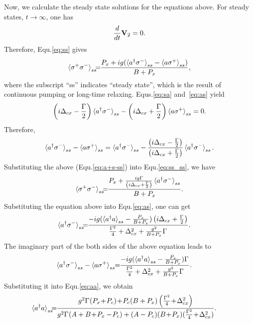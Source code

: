 Now, we calculate the steady state solutions for the equations above. For steady states, $t\rightarrow \infty$, one has
\begin{equation}
\frac{d}{dt} \mathbf{V}_2=0.
\end{equation}
Therefore, Equ.\eqref{eq:ss} gives
\begin{equation}\label{eq:ss_ss}
\mathinner{\langle{\sigma^+\sigma^-}\rangle}_{ss}\!\!\!=\!\!
\frac{P_x+ig(\mathinner{\langle{a^\dagger\sigma^-}\rangle}_{ss}-\mathinner{\langle{a\sigma^+}\rangle}_{ss})}{B+P_x},
\end{equation}
where the subscript ``ss'' indicates ``steady state'', which is the result of continuous pumping or long-time relaxing.
Equs.\eqref{eq:sa} and~\eqref{eq:as} yield
\begin{equation}
\left(i\Delta_{cx} - \frac{\Gamma}{2}\right)\mathinner{\langle{a^\dagger\sigma^-}\rangle}_{ss} -\left(i\Delta_{cx} + \frac{\Gamma}{2}\right)\mathinner{\langle{a\sigma^+}\rangle}_{ss} =0.
\end{equation}
Therefore,
\begin{equation}
\mathinner{\langle{a^\dagger\sigma^-}\rangle}_{ss}-\mathinner{\langle{a\sigma^+}\rangle}_{ss} = \mathinner{\langle{a^\dagger\sigma^-}\rangle}_{ss}- \frac{\left(i\Delta_{cx} - \frac{\Gamma}{2}\right)}{\left(i\Delta_{cx} + \frac{\Gamma}{2}\right)}\mathinner{\langle{a^\dagger\sigma^-}\rangle}_{ss}.\label{eq:a+s-ss}
\end{equation}
Substituting the above (Equ.\eqref{eq:a+s-ss}) into Equ.\eqref{eq:ss_ss}, we have
\begin{equation}
\mathinner{\langle{\sigma^+\sigma^-}\rangle}_{ss}\!\!\!=\!\!
\frac{P_x+\frac{ig\Gamma}{\left(i\Delta_{cx} + \frac{\Gamma}{2}\right)}\mathinner{\langle{a^\dagger\sigma^-}\rangle}_{ss}}{B+P_x}.
\end{equation}
Substituting the equation above into Equ.\eqref{eq:as}, one can get
\begin{equation}
\!\!\!\!\!\!\!\!\!\ave{a^\dagger\sigma^-}_{ss}\!\!\!= \!\!\frac{-ig(\ave{a^\dagger a}_{ss}-\frac{P_x}{B+P_x})\left(i\Delta_{cx}+\frac{\Gamma_{}}{2}\right)}{\frac{\Gamma_{}^2}{4}+\Delta_{cx}^2
+\frac{g^2}{B+P_x}\Gamma_{}}.
\end{equation}
The imaginary part of the both sides of the above equation leads to
\begin{equation}
\!\!\!\!\!\!\!\!\!\ave{a^\dagger\sigma^-}_{ss}-\ave{a\sigma^+}_{ss} \!\! = \!\!\frac{-ig(\ave{a^\dagger a}_{ss}-\frac{P_x}{B+P_x})\Gamma_{}}{\frac{\Gamma_{}^2}{4}+\Delta_{cx}^2
+\frac{g^2}{B+P_x}\Gamma_{}}.
\end{equation}
Substituting it into Equ.\eqref{eq:aa}, we obtain
\begin{equation}
\!\!\!\!\!\!\!\!\!\ave{a^\dagger a}_{ss}\!\!\!=\!\!\frac{g^2\Gamma_{}(P_x\!+\!P_c)\!+\!P_c(B+P_x)
\left(\frac{\Gamma_{}^2}{4}\!+\!\Delta_{cx}^2\right)}
{g^2\Gamma_{}(A+B\!+\!P_x-\!P_c) +(A-P_c)
(B\!+\!P_x)(\frac{\Gamma_{}^2}{4}\!+\!\Delta_{cx}^2)}. \label{eq:staticstates}
\end{equation}
